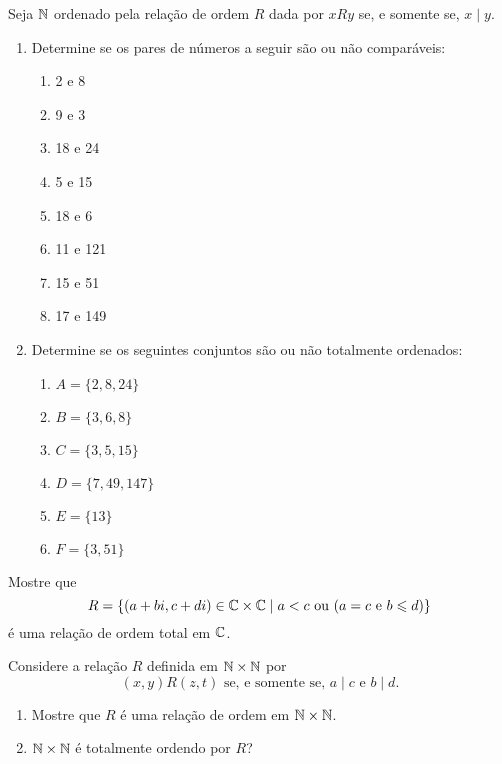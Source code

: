 \documentclass[12pt]{article}
\begin{document}
\questao Seja $\mathbb{N}$ ordenado pela relação de ordem $R$ dada por $xRy$ se, e somente se, $x \mid y$.
\begin{enumerate}[label={\alph*})]
	\item Determine se os pares de números a seguir são ou não comparáveis:
	\begin{multicols}{2}
		\begin{enumerate}[label={\roman*})]
			\item 2 e 8
			\item 9 e 3
			\item 18 e 24
			\item 5 e 15
			\item 18 e 6
			\item 11 e 121
			\item 15 e 51
			\item 17 e 149
		\end{enumerate}
	\end{multicols}
	\item Determine se os seguintes conjuntos são ou não totalmente ordenados:
	\begin{multicols}{2}
		\begin{enumerate}[label={\roman*})]
			\item $A = \{2,8,24\}$
			\item $B = \{3,6,8\}$
			\item $C = \{3,5,15\}$
			\item $D = \{7,49,147\}$
			\item $E = \{13\}$
			\item $F = \{3,51\}$
		\end{enumerate}
	\end{multicols}
\end{enumerate}

\vesp

\questao Mostre que
\[
	R = \{(a + bi, c + di) \in \mathbb{C} \times \mathbb{C} \mid a < c \mbox{ ou } (a = c \mbox{ e } b \leqslant d)\}
\]
é uma relação de ordem total em $\mathbb{C}$.

\vesp

\questao Considere a relação $R$ definida em $\mathbb{N} \times \mathbb{N}$ por
\[
	(x,y)R(z,t) \mbox{ se, e somente se, } a \mid c \mbox{ e } b \mid d.
\]
\begin{enumerate}[label={\alph*})]
	\item Mostre que $R$ é uma relação de ordem em $\mathbb{N} \times \mathbb{N}$.
	\item $\mathbb{N} \times \mathbb{N}$ é totalmente ordendo por $R$?
\end{enumerate}
\end{document}
